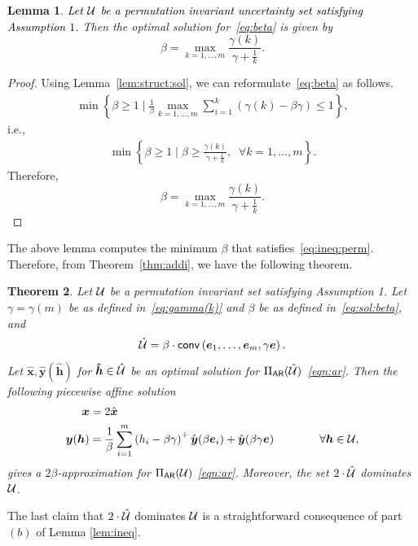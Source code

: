 \documentclass[11pt]{article}
\theoremstyle{plain}
\newtheorem{theorem}{Theorem}[section]
\newtheorem{lemma}[theorem]{Lemma}
\theoremstyle{definition}
\numberwithin{equation}{section}%
\numberwithin{equation}{section}%
\newcommand{\mb}[1]{\ensuremath{\boldsymbol{#1}}}
\newcommand*{\red}{\textcolor{black}}
\begin{document}
\begin{lemma}\label{thm:beta}
\red{Let ${\cal U}$ be  a permutation invariant uncertainty set satisfying Assumption $1$}. Then the optimal solution for~\eqref{eq:beta} is given by
\begin{equation}\label{eq:sol:beta}
\beta  = \max _{ k=1,\ldots,m}  \frac{\gamma(k)}{\gamma +\frac{1}{k}}.
\end{equation}
\end{lemma}
\begin{proof}
Using Lemma~\ref{lem:struct:sol}, we can reformulate~\eqref{eq:beta} as follows.
\begin{align*}
  \min \left\{ \beta \geq 1 \; \Big\vert \;   \frac{1}{\beta} \max _{ k=1,\ldots,m    }  \sum_{i=1}^k \left( \gamma(k) -\beta \gamma \right) \leq 1   \right\},
\end{align*}
i.e.,
\begin{align*}
 \min \left\{ \beta \geq 1 \; \Big\vert \;   \beta \geq \frac{\gamma(k)}{\gamma +\frac{1}{k}}, \; \; \forall k=1,\ldots,m \right\}.
 \end{align*}
Therefore,
$$\beta  = \max _{ k=1,\ldots,m}  \frac{\gamma(k)}{\gamma  +\frac{1}{k}}.  $$
 \end{proof}

The above lemma computes the minimum $\beta$ that satisfies~\eqref{eq:ineq:perm}. Therefore, from Theorem~\ref{thm:addi}, we have the following theorem.
\begin{theorem}\label{thm:perm-inv-beta}
Let ${\cal U}$ be a permutation invariant set satisfying Assumption 1. Let $\gamma = \gamma(m)$ be as defined in~\eqref{eq:gamma(k)} and $\beta$ be as defined in~\eqref{eq:sol:beta}, and
\[ \hat{\cal U} = \beta \cdot {\sf conv } \left( \mb e_1,\ldots,\mb e_m, \gamma \mb e \right).\]
Let $\mb{\hat{x}}, \mb{\hat{y}(\hat{h})}$ for $\mb{\hat{h}} \in \hat{\cal U }$ be an optimal solution for $\Pi_{\sf AR}(\hat{\cal U})$~\eqref{eqn:ar}. Then the following piecewise affine solution
\begin{equation} \label{perm_policy}
\begin{split}
 \mb x  & =  2 \hat{\mb x}  \\
 \mb y( \mb h )  & = \frac{1}{\beta}\sum_{i=1}^m \left( h_i -\beta \gamma \right)^+ \hat{\mb y }(  \beta \mb e_i)+ \hat{\mb y }( \beta \gamma \mb e) \qquad  \qquad \forall \mb h \in \cal U,
\end{split}
\end{equation}
gives a $2 \beta$-approximation for $\Pi_{\sf AR}({\cal U})$ \eqref{eqn:ar}. Moreover, the set $2 \cdot \hat{\cal U}$ dominates ${\cal U}$.
\end{theorem}
The last claim that $2 \cdot \hat{\cal U}$ dominates ${\cal U}$ is a straightforward consequence of part$ (b)$ of Lemma \ref{lem:ineq}.
\end{document}
